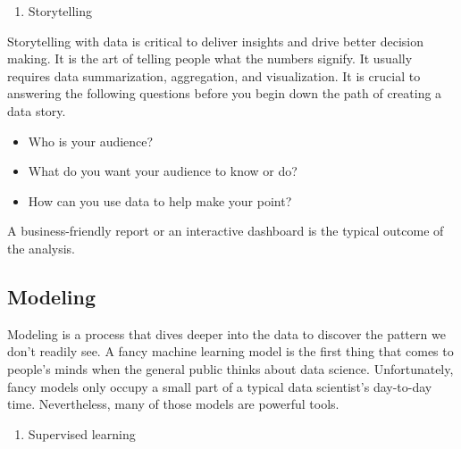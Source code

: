 \documentclass[
  12pt,
]{krantz}
\providecommand{\tightlist}{%
  \setlength{\itemsep}{0pt}\setlength{\parskip}{0pt}}
\begin{document}
\begin{enumerate}
\def\labelenumi{(\arabic{enumi})}
\setcounter{enumi}{2}
\tightlist
\item
  Storytelling
\end{enumerate}

Storytelling with data is critical to deliver insights and drive better decision making. It is the art of telling people what the numbers signify. It usually requires data summarization, aggregation, and visualization. It is crucial to answering the following questions before you begin down the path of creating a data story.

\begin{itemize}
\tightlist
\item
  Who is your audience?
\item
  What do you want your audience to know or do?
\item
  How can you use data to help make your point?
\end{itemize}

A business-friendly report or an interactive dashboard is the typical outcome of the analysis.

\hypertarget{modeling}{%
\subsection{Modeling}\label{modeling}}

Modeling is a process that dives deeper into the data to discover the pattern we don't readily see. A fancy machine learning model is the first thing that comes to people's minds when the general public thinks about data science. Unfortunately, fancy models only occupy a small part of a typical data scientist's day-to-day time. Nevertheless, many of those models are powerful tools.

\begin{enumerate}
\def\labelenumi{(\arabic{enumi})}
\tightlist
\item
  Supervised learning
\end{enumerate}
\end{document}
